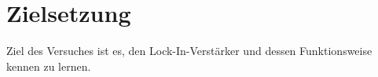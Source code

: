 
\section{Zielsetzung}
\label{sec:Zielsetzung}

Ziel des Versuches ist es, den Lock-In-Verstärker und dessen Funktionsweise kennen zu lernen.